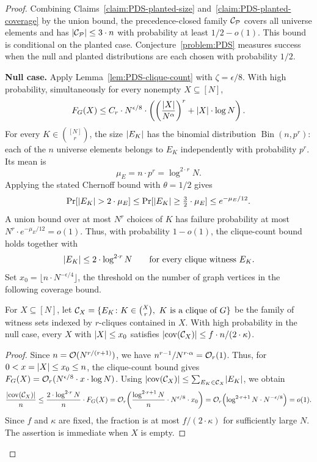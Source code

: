 \begin{proof}
    Combining Claims~\ref{claim:PDS-planted-size} and~\ref{claim:PDS-planted-coverage} by the union bound, the precedence-closed family $\mathcal{C}_{\mathcal P}$ covers all universe elements and has $\mathopen{}\left| \mathcal{C}_{\mathcal P} \right|\leq3\cdot n$ with probability at least $1/2-o(1)$. This bound is conditional on the planted case. Conjecture~\ref{problem:PDS} measures success when the null and planted distributions are each chosen with probability $1/2$.

    \par\noindent\textbf{Null case.}
    Apply Lemma~\ref{lem:PDS-clique-count} with $\zeta=\epsilon/8$. With high probability, simultaneously for every nonempty $X\subseteq[N]$,
    \[
        F_G(X)\leq C_r \cdot N^{\epsilon/8} \cdot \mathopen{}\left( \mathopen{}\left( \frac{\mathopen{}\left| X \right|}{N^\alpha} \right)^r+\mathopen{}\left| X \right| \cdot \log N \right).
    \]
    For every $K\in\binom{[N]}{r}$, the size $\mathopen{}\left| E_K \right|$ has the binomial distribution $\operatorname{Bin}(n,p^r)$: each of the $n$ universe elements belongs to $E_K$ independently with probability $p^r$. Its mean is
    \[
        \mu_E=n\cdot p^r=\log^{2\cdot r} N.
    \]
    Applying the stated Chernoff bound with $\theta=1/2$ gives
    \[
        \Pr[\spr{E_K}>2\cdot\mu_E]
        \leq\Pr[\spr{E_K}\geq\tfrac32\cdot\mu_E]
        \leq e^{-\mu_E/12}.
    \]
    A union bound over at most $N^r$ choices of $K$ has failure probability at most $N^r\cdot e^{-\mu_E/12}=o(1)$. Thus, with probability $1-o(1)$, the clique-count bound holds together with
    \[
        \mathopen{}\left| E_K \right|\leq2\cdot\log^{2\cdot r} N\qquad\text{for every clique witness }E_K.
    \]
    Set $x_0=\lfloor n\cdot N^{-\epsilon/4}\rfloor$, the threshold on the number of graph vertices in the following coverage bound.
    \begin{claim}\label{claim:PDS-no-coverage}
        For $X\subseteq[N]$, let $\cC_X=\{E_K\colon K\in\binom{X}{r},\ K\text{ is a clique of }G\}$ be the family of witness sets indexed by $r$-cliques contained in $X$. With high probability in the null case, every $X$ with $\mathopen{}\left| X \right|\leq x_0$ satisfies $\mathopen{}\left| \operatorname{cov}\mathopen{}\left( \mathcal{C}_X \right) \right|\leq f\cdot n/(2\cdot\kappa)$.
    \end{claim}
    \begin{proof}
        Since $n=\mathcal{O}(N^{r/(r+1)})$, we have $n^{r-1}/N^{r\cdot\alpha}=\mathcal{O}_r(1)$. Thus, for $0<x=\mathopen{}\left| X \right|\leq x_0\leq n$, the clique-count bound gives $F_G(X)=\mathcal{O}_r(N^{\epsilon/8}\cdot x\cdot\log N)$. Using $\mathopen{}\left| \operatorname{cov}\mathopen{}\left( \mathcal{C}_X \right) \right|\leq\sum_{E_K\in\mathcal{C}_X}\mathopen{}\left| E_K \right|$, we obtain
        \[
            \frac{\mathopen{}\left| \operatorname{cov}\mathopen{}\left( \mathcal{C}_X \right) \right|}{n}
            \leq\frac{2\cdot\log^{2\cdot r} N}{n}\cdot F_G(X)
            =\mathcal{O}_r\mathopen{}\left( \frac{\log^{2\cdot r+1} N}{n}\cdot N^{\epsilon/8}\cdot x_0 \right)
            =\mathcal{O}_r\mathopen{}\left( \log^{2\cdot r+1} N\cdot N^{-\epsilon/8} \right)=o(1).
        \]
        Since $f$ and $\kappa$ are fixed, the fraction is at most $f/(2\cdot\kappa)$ for sufficiently large $N$. The assertion is immediate when $X$ is empty.
    \end{proof}


\end{proof}
